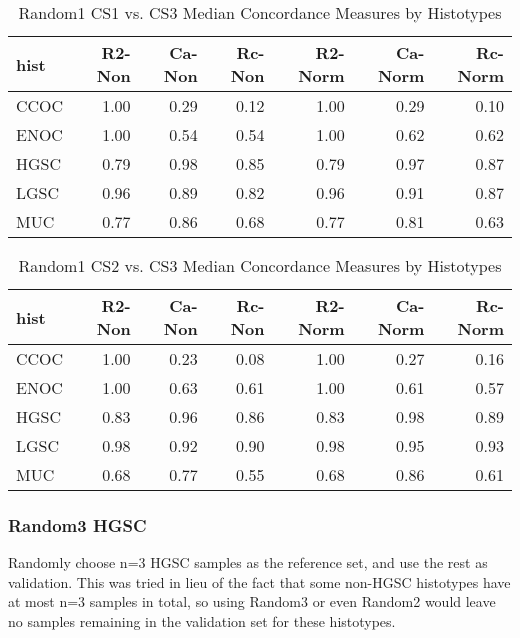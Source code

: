 \documentclass[
]{report}
\begin{document}
\begin{table}

\caption{\label{tab:rand1-cs1-vs-cs3}Random1 CS1 vs. CS3 Median Concordance Measures by Histotypes}
\centering
\begin{tabular}[t]{l|r|r|r|r|r|r}
\hline
hist & R2-Non & Ca-Non & Rc-Non & R2-Norm & Ca-Norm & Rc-Norm\\
\hline
CCOC & 1.00 & 0.29 & 0.12 & 1.00 & 0.29 & 0.10\\
\hline
ENOC & 1.00 & 0.54 & 0.54 & 1.00 & 0.62 & 0.62\\
\hline
HGSC & 0.79 & 0.98 & 0.85 & 0.79 & 0.97 & 0.87\\
\hline
LGSC & 0.96 & 0.89 & 0.82 & 0.96 & 0.91 & 0.87\\
\hline
MUC & 0.77 & 0.86 & 0.68 & 0.77 & 0.81 & 0.63\\
\hline
\end{tabular}
\end{table}

\begin{table}

\caption{\label{tab:rand1-cs2-vs-cs3}Random1 CS2 vs. CS3 Median Concordance Measures by Histotypes}
\centering
\begin{tabular}[t]{l|r|r|r|r|r|r}
\hline
hist & R2-Non & Ca-Non & Rc-Non & R2-Norm & Ca-Norm & Rc-Norm\\
\hline
CCOC & 1.00 & 0.23 & 0.08 & 1.00 & 0.27 & 0.16\\
\hline
ENOC & 1.00 & 0.63 & 0.61 & 1.00 & 0.61 & 0.57\\
\hline
HGSC & 0.83 & 0.96 & 0.86 & 0.83 & 0.98 & 0.89\\
\hline
LGSC & 0.98 & 0.92 & 0.90 & 0.98 & 0.95 & 0.93\\
\hline
MUC & 0.68 & 0.77 & 0.55 & 0.68 & 0.86 & 0.61\\
\hline
\end{tabular}
\end{table}

\hypertarget{random3-hgsc}{%
\subsubsection{Random3 HGSC}\label{random3-hgsc}}

Randomly choose n=3 HGSC samples as the reference set, and use the rest as validation. This was tried in lieu of the fact that some non-HGSC histotypes have at most n=3 samples in total, so using Random3 or even Random2 would leave no samples remaining in the validation set for these histotypes.
\end{document}
